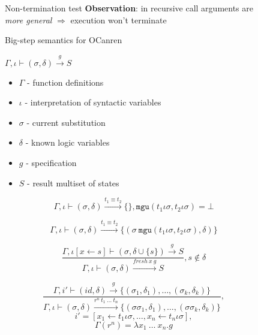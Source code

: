 \documentclass[final,20pt]{beamer}
\begin{document}
\begin{frame}[t]
\begin{columns}[t]
\begin{column}{\onecolwid}
  \end{column}

  \begin{column}{\sepwid}\end{column} %

  \begin{column}{\onecolwid} %
  
    \begin{block}{Non-termination test}
      \textbf{Observation}: in recursive call arguments are \\ \textit{more general} $\Rightarrow$ execution won't terminate
      \bigskip
      \bigskip
      
      \begin{center} Big-step semantics for OCanren \end{center}
	  \begin{center} $\Gamma, \iota \vdash (\sigma, \delta) \xrightarrow{g} S$ \end{center}
      \begin{itemize}
        \item $\Gamma$ - function definitions
        \item $\iota$ - interpretation of syntactic variables
        \item $\sigma$ - current substitution
        \item $\delta$ - known logic variables
        \item $g$ - specification
        \item $S$ - result multiset of states
      \end{itemize}
      
      \[ \Gamma, \iota \vdash (\sigma, \delta) \xrightarrow{t_1 \equiv t_2} \{\}, \texttt{mgu}(t_1 \iota \sigma, t_2 \iota \sigma) = \bot \]
      
      \[ \Gamma, \iota \vdash (\sigma, \delta) \xrightarrow{t_1 \equiv t_2} \{(\sigma \ \texttt{mgu}(t_1 \iota \sigma, t_2 \iota \sigma), \delta)\} \]
      
      \[ \frac{ \Gamma, \iota[x \leftarrow s] \vdash (\sigma, \delta \cup \{s\}) \xrightarrow{g} S }{ \Gamma, \iota \vdash (\sigma, \delta) \xrightarrow{ fresh \ x \ g} S }, s \not\in \delta \]
      
      \[ \frac{ \Gamma, i' \vdash (id, \delta) \xrightarrow{g} \{ (\sigma_1, \delta_1), \dots, (\sigma_k, \delta_k) \}  }{ \Gamma, \iota \vdash (\sigma, \delta) \xrightarrow{ r^n \ t_1 \ \dots \ t_n} \{ (\sigma \sigma_1, \delta_1), \dots, (\sigma \sigma_k, \delta_k)\} }, \]
      \[ i' = [x_1 \leftarrow t_1 \iota \sigma, \dots, x_n \leftarrow t_n \iota \sigma], \]
      \[ \Gamma(r^n) = \lambda x_1 \ \dots \ x_n. g \]
      

\end{block}
\end{column}
\end{columns}
\end{frame}
\end{document}

